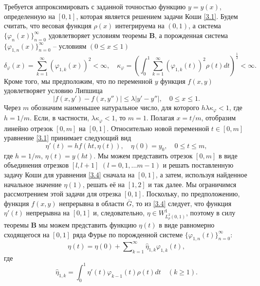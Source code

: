   Требуется аппроксимировать с заданной точностью  функцию $y=y(x)$, определенную на $[0,1]$, которая является решением задачи Коши \eqref{3.1}.
Будем считать, что весовая функция $\rho(x)$ интегрируема на $(0,1)$, а система $\{\varphi_{n}(x)\}_{n=0}^\infty$ удовлетворяет условиям теоремы \textbf{ B}, а порожденная система $\{\varphi_{1,n}(x)\}_{n=0}^\infty$ -- условиям $(0\le x\le 1)$
\begin{equation}\label{3.2}
\delta_\varphi(x)=\sum_{k=1}^{\infty}(\varphi_{1,k}(x))^2<\infty,\quad
\kappa_{\varphi}=\left(\int_0^1\sum_{k=1}^{\infty}
(\varphi_{1,k}(t))^2\rho(t)dt\right)^{\frac12}<\infty.
\end{equation}
Кроме того, мы предположим, что по переменной $y$ функция $f(x,y)$ удовлетворяет условию Липшица
 \begin{equation}\label{3.3}
|f(x,y')-f(x,y'')|\le \lambda|y'-y''|, \quad 0\le x \le 1.
\end{equation}
Через $m$ обозначим наименьшее натуральное число, для которого $h\lambda\kappa_\varphi<1$, где $h=1/m$. Если, в частности, $\lambda\kappa_\varphi<1$, то $m=1$. Полагая $x=t/m$, отобразим линейно отрезок $[0,m]$ на $[0,1]$. Относительно новой переменной $t\in [0,m]$ уравнение \eqref{3.1} принимает следующий вид
\begin{equation}\label{3.4}
\eta'(t)=hf(ht,\eta(t)), \quad \eta(0)=y_0,\quad 0\le t\le m,
\end{equation}
где $h=1/m$, $\eta(t)=y(ht)$. Мы можем представить отрезок $[0,m]$ в виде объединения отрезков $[l,l+1]$ $(l=0,1,\ldots m-1)$ и  решать поставленную задачу Коши для уравнения \eqref{3.4} сначала на $[0,1]$, а затем, используя найденное начальное значение $\eta(1)$,  решать её на $[1,2]$ и так далее. Мы ограничимся рассмотрением этой задачи для отрезка $[0,1]$. Поскольку, по предположению, функция $f(x,y)$ непрерывна в области $\bar G$, то из \eqref{3.4} следует, что  функция $\eta'(t)$ непрерывна на $[0,1]$ и, следовательно, $\eta\in W_{L_\rho^2(0,1)}^1$, поэтому в силу теоремы \textbf{ B}  мы можем представить  функцию $\eta(t)$ в виде равномерно сходящегося на $[0,1]$ ряда Фурье по порожденной системе $\{\varphi_{1,n}(t)\}_{n=0}^\infty$:
\begin{equation}\label{3.5}
\eta(t)= \eta(0)+ \sum\nolimits_{k=1}^\infty \hat \eta_{1,k}\varphi_{1,k}(t),
\end{equation}
где
  \begin{equation}\label{3.6}
\hat \eta_{1,k}=\int_{0}^1 \eta'(t)\varphi_{k-1}(t)\rho(t)dt\quad(k\ge1).
\end{equation}
